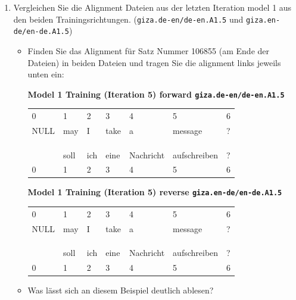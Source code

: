 \documentclass[12pt,fleqn]{article}
\begin{document}
\begin{enumerate}
\begin{enumerate}
\item Vergleichen Sie die Alignment Dateien aus der letzten Iteration model 1 aus den beiden Trainingsrichtungen. (\texttt{giza.de-en/de-en.A1.5} und \texttt{giza.en-de/en-de.A1.5}) 

\begin{itemize} 
 \item Finden Sie das Alignment für Satz Nummer 106855 (am Ende der Dateien) in beiden Dateien und tragen Sie die alignment links jeweils unten ein:
 
 \vspace{0.5cm}
 \textbf{Model 1 Training (Iteration 5) forward \texttt{giza.de-en/de-en.A1.5}} \\ 
 
  \begin{table}[h] 
 \begin{center} 
\begin{tabular}{lllllll} 
0 & 1&2&3&4&5&6\\ 
NULL &  may & I & take & a & message & ? \\  
&&&&&& \\ 
&&&&&&\\ 
&&&&&&\\ 
& soll & ich & eine & Nachricht & aufschreiben & ? \\ 
0 & 1&2&3&4&5&6\\ 
\end{tabular}
 \end{center}
\end{table}
 
 
 \vspace{0.5cm} 
 \textbf{Model 1 Training (Iteration 5) reverse \texttt{giza.en-de/en-de.A1.5}} \\ 
 
 
   \begin{table}[h] 
 \begin{center} 
\begin{tabular}{lllllll} 
0 & 1&2&3&4&5&6\\ 
NULL &  may & I & take & a & message & ? \\  
&&&&&& \\ 
&&&&&&\\ 
&&&&&&\\ 
& soll & ich & eine & Nachricht & aufschreiben & ? \\ 
0 & 1&2&3&4&5&6\\ 
\end{tabular}
 \end{center}
\end{table}
 \item Was lässt sich an diesem Beispiel deutlich ablesen?
\end{itemize}


\end{enumerate}
\end{enumerate}
\end{document}
